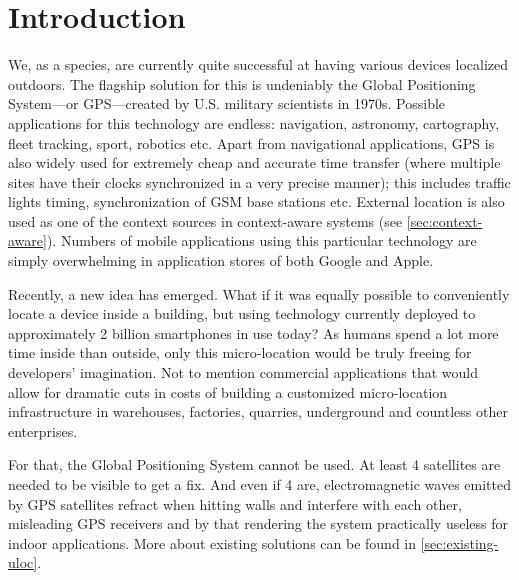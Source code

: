\chapter{Introduction}
\label{cha:introduction}



We, as a species, are currently quite successful at having various devices localized outdoors. The flagship solution for this is undeniably the Global Positioning System---or GPS---created by U.S. military scientists in 1970s. Possible applications for this technology are endless: navigation, astronomy, cartography, fleet tracking, sport, robotics etc. Apart from navigational applications, GPS is also widely used for extremely cheap and accurate time transfer (where multiple sites have their clocks synchronized in a very precise manner); this includes traffic lights timing, synchronization of GSM base stations etc. External location is also used as one of the context sources in context-aware systems (see \cref{sec:context-aware}). Numbers of mobile applications using this particular technology are simply overwhelming in application stores of both Google and Apple.

Recently, a new idea has emerged. What if it was equally possible to conveniently locate a device inside a building, but using technology currently deployed to approximately 2 billion smartphones in use today? As humans spend a lot more time inside than outside, only this micro-location would be truly freeing for developers' imagination. Not to mention commercial applications that would allow for dramatic cuts in costs of building a customized micro-location infrastructure in warehouses, factories, quarries, underground and countless other enterprises.


For that, the Global Positioning System cannot be used. At least 4 satellites are needed to be visible to get a fix. And even if 4 are, electromagnetic waves emitted by GPS satellites refract when hitting walls and interfere with each other, misleading GPS receivers and by that rendering the system practically useless for indoor applications. More about existing solutions can be found in \cref{sec:existing-uloc}.




